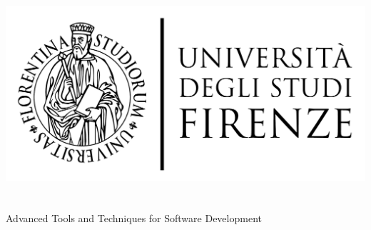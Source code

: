 \begin{titlepage}
	\begin{center}
   	\large
      \hfill
      \vfill
      \begingroup
         \includegraphics[scale=0.15]{logo/LOGO}\\
			\myFaculty \\
			\myDegree \\ 
			\vspace{0.5cm}
         \vspace{0.5cm}    
         Advanced Tools and Techniques for Software Development  
      \endgroup 
      \vfill 
      \begingroup
      	\spacedallcaps{\myItalianTitle} \\ $\ $\\
	\bigskip
      \endgroup
      \spacedlowsmallcaps{\myName}
      \vfill
      \vfill
      \vfill
      \myTime
      \vfill                      
	\end{center}        
\end{titlepage}